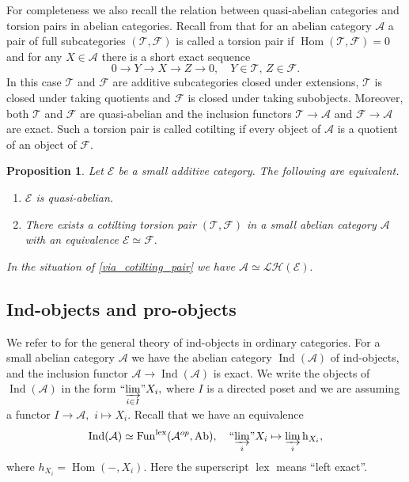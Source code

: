 \documentclass[11pt,leqno]{amsart}
\newtheorem{prop}[theo]{Proposition}
\numberwithin{equation}{section}
\def\h{\operatorname{h}}
\def\Hom{\operatorname{Hom}}
\newcommand{\indlim}[1][]{\mathop{\varinjlim}\limits_{#1}}
\newcommand{\inddlim}[1][]{{``{\indlim[#1]}"}}
\newcommand{\lex}{\operatorname{lex}}
\newcommand{\cF}{{\mathcal F}}
\newcommand{\cL}{{\mathcal L}}
\newcommand{\cA}{{\mathcal A}}
\newcommand{\cE}{{\mathcal E}}
\newcommand{\cT}{{\mathcal T}}
\newcommand{\cH}{{\mathcal H}}
\newcommand{\Fun}{\operatorname{Fun}}
\newcommand{\Ab}{\operatorname{Ab}}
\newcommand{\Ind}{\operatorname{Ind}}
\begin{document}
For completeness we also recall the relation between quasi-abelian categories and torsion pairs in abelian categories. Recall from \cite{HRS96} that for an abelian category $\cA$ a pair of full subcategories $(\cT,\cF)$ is called a torsion pair if $\Hom(\cT,\cF)=0$ and for any $X\in\cA$ there is a short exact sequence
\begin{equation*}
0\to Y\to X\to Z\to 0,\quad Y\in\cT,\,Z\in\cF.
\end{equation*}
In this case $\cT$ and $\cF$ are additive subcategories closed under extensions, $\cT$ is closed under taking quotients and $\cF$ is closed under taking subobjects. Moreover, both $\cT$ and $\cF$ are quasi-abelian and the inclusion functors $\cT\to\cA$ and $\cF\to\cA$ are exact. Such a torsion pair is called cotilting if every object of $\cA$ is a quotient of an object of $\cF.$

\begin{prop}\cite[Proposition B.3]{BVdB03}
Let $\cE$ be a small additive category. The following are equivalent.
\begin{enumerate}[label=(\roman*),ref=(\roman*)]
	\item $\cE$ is quasi-abelian.
	\item There exists a cotilting torsion pair $(\cT,\cF)$ in a small abelian category $\cA$ with an equivalence $\cE\simeq \cF.$ \label{via_cotilting_pair}
\end{enumerate}
In the situation of \ref{via_cotilting_pair} we have $\cA\simeq\cL\cH(\cE).$
\end{prop} 

\subsection{Ind-objects and pro-objects}
\label{ssec:ind_obj_pro_obj}

We refer to \cite{KS01} for the general theory of ind-objects in ordinary categories. For a small abelian category $\cA$ we have the abelian category $\Ind(\cA)$ of ind-objects, and the inclusion functor $\cA\to\Ind(\cA)$ is exact. We write the objects of $\Ind(\cA)$ in the form $\inddlim[i\in I]X_i,$ where $I$ is a directed poset and we are assuming a functor $I\to\cA,$ $i\mapsto X_i.$ Recall that we have an equivalence
\begin{equation*}
\Ind(\cA)\simeq \Fun^{\lex}(\cA^{op},\Ab),\quad \inddlim[i] X_i\mapsto \indlim[i] \h_{X_i},
\end{equation*}
where $h_{X_i}=\Hom(-,X_i).$ Here the superscript $\lex$ means ``left exact''. 
\end{document}
